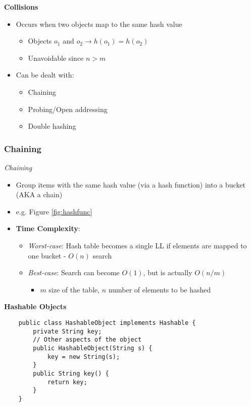 \documentclass[10pt, 
a4paper, 
oneside, 
headinclude, footinclude, 
BCOR5mm]
{scrartcl}
\begin{document}
\textbf{Collisions}
\begin{itemize}
    \item Occurs when two objects map to the same hash value
    \begin{itemize}
        \item Objects $o_1$ and $o_2\rightarrow h(o_1)=h(o_2)$
        \item Unavoidable since $n>m$
    \end{itemize}
    \item Can be dealt with:
    \begin{itemize}
        \item Chaining
        \item Probing/Open addressing
        \item Double hashing
    \end{itemize}
\end{itemize}

\subsubsection{Chaining}
\begin{definition}
    \textit{Chaining}
    \begin{itemize}
        \item Group items with the same hash value (via a hash function) into a bucket (AKA a chain)
        \item e.g. Figure \vref{fig:hashfunc}
        \item \textbf{Time Complexity}:
        \begin{itemize}
            \item \textit{Worst-case}: Hash table becomes a single LL if elements are mapped to one bucket - $O(n)$ search
            \item \textit{Best-case}: Search can become $O(1)$, but is actually $O(n/m)$
            \begin{itemize}
                \item $m$ size of the table, $n$ number of elements to be hashed
            \end{itemize}
        \end{itemize}
    \end{itemize}
\end{definition}

\textbf{Hashable Objects}
\begin{lstlisting}
    public class HashableObject implements Hashable {
        private String key;
        // Other aspects of the object
        public HashableObject(String s) {
            key = new String(s);
        }
        public String key() {
            return key;
        }
    }
\end{lstlisting}
\end{document}
